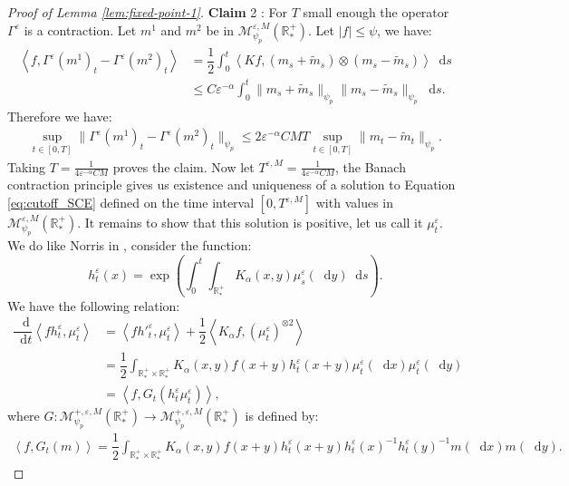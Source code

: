 \documentclass[11pt,a4paper]{article}
\newcommand{\RRP}{\mathbb{R}^+_*}
\newcommand{\MC}{\mathcal{M}}
\newcommand{\brac}[1]{\left\langle#1\right\rangle}
\newcommand{\dd}{\mathop{}\!\mathrm{d}}
\begin{document}
\begin{proof}[Proof of Lemma \ref{lem:fixed-point-1}]
    \textbf{Claim} 2 : For $T$ small enough the operator $\Gamma^\varepsilon$ is a contraction. Let $m^1$ and $m^2$ be in $\MC^{\varepsilon,M}_{\psi_p}\left(\RRP\right)$. Let $|f| \leq \psi$, we have:
    \begin{align*}
        \brac{f,\Gamma^\varepsilon(m^1)_t - \Gamma^\varepsilon(m^2)_t}
        &= \dfrac{1}{2}\int_0^t \brac{Kf,\left(m_s + \tilde{m}_s\right)\otimes\left( m_s - \tilde{m}_s\right)} \dd s \\
        &\leq C\varepsilon^{-\alpha}\int_0^t \|m_s + \tilde{m}_s\|_{\psi_p} \|m_s - \tilde{m}_s\|_{\psi_p}\dd s .
    \end{align*}
    Therefore we have:
    \begin{align*}
        \sup\limits_{t \in [0,T]} \|\Gamma^\varepsilon(m^1)_t - \Gamma^\varepsilon(m^2)_t\|_{\psi_p} \leq 2\varepsilon^{-\alpha} CMT\sup\limits_{t \in [0,T]} \|m_t - \tilde{m}_t\|_{\psi_p} .
    \end{align*}
    Taking $T = \frac{1}{4\varepsilon^{-\alpha}CM}$ proves the claim. Now let $T^{\varepsilon,M} = \frac{1}{4\varepsilon^{-\alpha}CM}$, the Banach contraction principle gives us existence and uniqueness of a solution to Equation \eqref{eq:cutoff_SCE} defined on the time interval $[0,T^{\varepsilon,M}]$ with values in $\MC^{\varepsilon,M}_{\psi_p}\left(\RRP\right)$. It remains to show that this solution is positive, let us call it $\mu_t^\varepsilon$. We do like Norris in \cite{norrisSmoluchowskisCoagulationEquation1999}, consider the function:
    \[
    h^\varepsilon_t(x) = \exp\left(\int_0^t\int_{\RRP}K_\alpha (x,y) \mu^\varepsilon_s(\dd y) \dd s\right).
    \]
    We have the following relation:
    \begin{align*}
        \dfrac{\dd}{\dd t}\brac{fh^\varepsilon_t,\mu^\varepsilon_t} &= \brac{fh'^{\varepsilon}_t,\mu^\varepsilon_t} + \dfrac{1}{2}\brac{K_\alpha f,\left(\mu^\varepsilon_t\right)^{\otimes 2}}\\
        &= \dfrac{1}{2}\int_{\RRP\times\RRP} K_\alpha(x,y) f(x+y)h^\varepsilon_t(x+y)\mu^\varepsilon_t(\dd x)\mu^\varepsilon_t(\dd y) \\
        &= \brac{f,G_t(h^\varepsilon_t\mu^\varepsilon_t)},
    \end{align*}
    where $G : \MC^{+,\varepsilon,M}_{\psi_p}(\RRP) \to \MC^{+,\varepsilon,M}_{\psi_p}(\RRP)$ is defined by:
    \begin{align*}
        \brac{f,G_t(m)} =  \dfrac{1}{2}\int_{\RRP\times\RRP} K_\alpha(x,y) f(x+y)h^\varepsilon_t(x+y) h^\varepsilon_t(x)^{-1} h^\varepsilon_t(y)^{-1}m(\dd x)m(\dd y).

\end{align*}
\end{proof}
\end{document}
